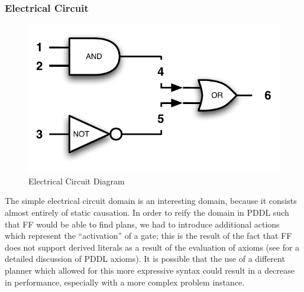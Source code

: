 


\subsubsection{Electrical Circuit}
\begin{figure}[htbp]
    \centering
        \includegraphics[scale=.5]{../images/circuit.pdf}
    \caption{Electrical Circuit Diagram}
    \label{fig:circuit}
\end{figure}

The simple electrical circuit domain is an interesting domain, because it consists almost entirely of static causation. In order to reify the domain in PDDL such that FF would be able to find plans, we had to introduce additional actions which represent the ``activation'' of a gate; this is the result of the fact that FF does not support derived literals as a result of the evaluation of axioms (see \cite{Thiebaux:2003ys} for a detailed discussion of PDDL axioms). It is possible that the use of a different planner which allowed for this more expressive syntax could result in a decrease in performance, especially with a more complex problem instance. 




